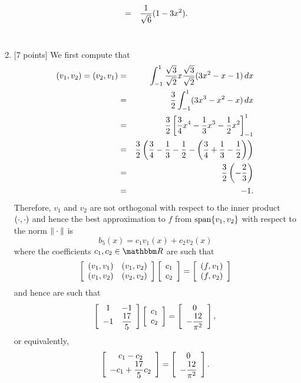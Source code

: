 \begin{solution}
\begin{enumerate}
\begin{eqnarray*}
\\
&=&{1 \over \sqrt{6}}(1-3x^2).
\end{eqnarray*}
\\
\item {[7 points]} We first compute that
\begin{eqnarray*}
(v_1,v_2)=(v_2,v_1)&=&\int_{-1}^1{\sqrt{3} \over \sqrt{2}}x{\sqrt{3} \over \sqrt{2}}(3x^2-x-1)\,dx
\\
&=&{3 \over 2}\int_{-1}^1(3x^3-x^2-x)\,dx
\\
&=&{3 \over 2}\left[{3 \over 4}x^4-{1 \over 3}x^3-{1 \over 2}x^2\right]_{-1}^1
\\
&=&{3 \over 2}\left({3 \over 4}-{1 \over 3}-{1 \over 2}-\left({3 \over 4}+{1 \over 3}-{1 \over 2}\right)\right)
\\
&=&{3 \over 2}\left(-{2 \over 3}\right)
\\
&=&-1.
\end{eqnarray*}
Therefore, $v_1$ and $v_2$ are not orthogonal with respect to the inner product $(\cdot,\cdot)$ and hence the best approximation to $f$ from ${\rm span}\{v_1,v_2\}$ with respect to the norm $\|\cdot\|$ is
\[
b_5(x)=c_1v_1(x)+c_2v_2(x)
\]
where the coefficients $c_1,c_2\in\R$ are such that
\[
\left[\begin{array}{cc} (v_1,v_1) & (v_1,v_2) \\ (v_1,v_2) & (v_2,v_2) \end{array}\right]\left[\begin{array}{c} c_1 \\ c_2 \end{array}\right]=\left[\begin{array}{c} (f,v_1) \\ (f,v_2) \end{array}\right]
\]
and hence are such that
\[
\left[\begin{array}{cc} 1 & -1 \\ -1 & \displaystyle{{17 \over 5}} \end{array}\right]\left[\begin{array}{c} c_1 \\ c_2 \end{array}\right]=\left[\begin{array}{c} 0 \\ \displaystyle{-{12 \over \pi^2}} \end{array}\right],
\]
or equivalently,
\[
\left[\begin{array}{c} c_1-c_2 \\ \displaystyle{-c_1+{17 \over 5}c_2} \end{array}\right]=\left[\begin{array}{c} 0 \\ \displaystyle{-{12 \over \pi^2}} \end{array}\right].
\]
\end{enumerate}
\end{solution}
